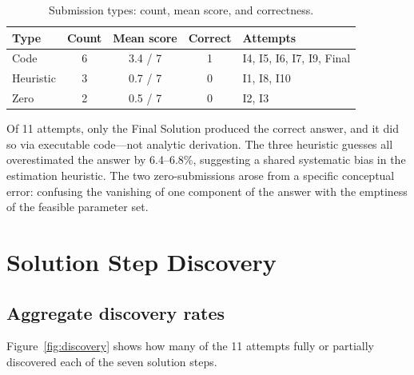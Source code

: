 \documentclass[11pt,a4paper]{article}
\begin{document}
\begin{table}[H]
\centering
\caption{Submission types: count, mean score, and correctness.}
\label{tab:types}
\begin{tabular}{@{}lcccl@{}}
\toprule
\textbf{Type} & \textbf{Count} & \textbf{Mean score}
  & \textbf{Correct} & \textbf{Attempts} \\
\midrule
Code      & 6 & 3.4 / 7 & 1 & I4, I5, I6, I7, I9, Final \\
Heuristic & 3 & 0.7 / 7 & 0 & I1, I8, I10 \\
Zero      & 2 & 0.5 / 7 & 0 & I2, I3 \\
\bottomrule
\end{tabular}
\end{table}

\begin{finding}
Of 11 attempts, only the Final Solution produced the correct answer,
and it did so via executable code---not analytic derivation. The
three heuristic guesses all overestimated the answer by 6.4--6.8\%,
suggesting a shared systematic bias in the estimation heuristic.
The two zero-submissions arose from a specific conceptual error:
confusing the vanishing of one component of the answer with the
emptiness of the feasible parameter set.
\end{finding}


\section{Solution Step Discovery}\label{sec:steps}

\subsection{Aggregate discovery rates}

Figure~\ref{fig:discovery} shows how many of the 11 attempts fully
or partially discovered each of the seven solution steps.
\end{document}
